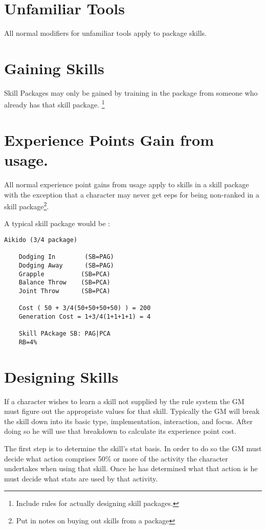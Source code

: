 \section{Unfamiliar Tools}
All normal modifiers for unfamiliar tools apply to package skills.

\section{Gaining Skills}
Skill Packages may only be gained by training in the package from
someone who already has that skill package. \footnote{ Include rules for 
actually designing skill packages. }

\section{Experience Points Gain from usage.}

All normal experience point gains from usage apply to skills in a skill
package with the exception that a character may never get eeps for
being non-ranked in a skill package\footnote{Put in notes on buying 
out skills from a package}. 

A typical skill package would be :

\begin{verbatim}
Aikido (3/4 package)

	Dodging In		  (SB=PAG)
	Dodging Away	  (SB=PAG)
	Grapple			 (SB=PCA)
	Balance Throw	 (SB=PCA)
	Joint Throw		 (SB=PCA)

	Cost ( 50 + 3/4(50+50+50+50) ) = 200
	Generation Cost = 1+3/4(1+1+1+1) = 4

	Skill PAckage SB: PAG|PCA
	RB=4%

\end{verbatim}

\section{Designing Skills}

If a character wishes to learn a skill not supplied by the rule 
system the GM must figure out the appropriate values for that skill. 
Typically the GM will break the skill down into its basic type, 
implementation, interaction, and focus. After doing so he will use 
that breakdown to calculate its experience point cost.

The first step is to determine the skill's stat basis. In order to do 
so the GM must decide what action comprises 50\% or more of the activity
the character undertakes when using that skill. Once he has determined 
what that action is he must decide what stats are used by that activity.

